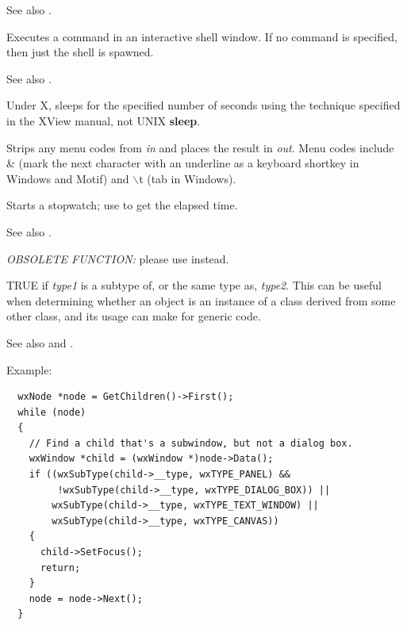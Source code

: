 See also .

\label{wxshell}


Executes a command in an interactive shell window. If no command is
specified, then just the shell is spawned.

See also .



Under X, sleeps for the specified number of seconds using the
technique specified in the XView manual, not UNIX {\bf sleep}.



Strips any menu codes from {\it in} and places the result
in {\it out}. Menu codes include \& (mark the next character with an underline
as a keyboard shortkey in Windows and Motif) and $\backslash$t (tab in Windows).

\label{wxstarttimer}


Starts a stopwatch; use  to get the elapsed time.

See also .

\label{wxsubtype}


{\it OBSOLETE FUNCTION:} please use  instead.

TRUE if {\it type1} is a subtype of, or the same type as, {\it type2}. This can
be useful when determining whether an object is an instance of a class derived from
some other class, and its usage can make for generic code.

See also  and .

Example:

\begin{verbatim}
  wxNode *node = GetChildren()->First();
  while (node)
  {
    // Find a child that's a subwindow, but not a dialog box.
    wxWindow *child = (wxWindow *)node->Data();
    if ((wxSubType(child->__type, wxTYPE_PANEL) &&
         !wxSubType(child->__type, wxTYPE_DIALOG_BOX)) ||
        wxSubType(child->__type, wxTYPE_TEXT_WINDOW) ||
        wxSubType(child->__type, wxTYPE_CANVAS))
    {
      child->SetFocus();
      return;
    }
    node = node->Next();
  }
\end{verbatim}

